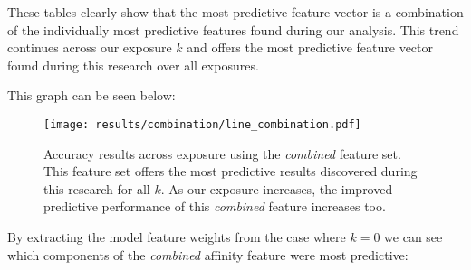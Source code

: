 These tables clearly show that the most predictive feature vector is a combination of the individually most predictive 
features found during our analysis. This trend continues across our exposure $k$ and offers the most predictive feature 
vector found during this research over all exposures.

This graph can be seen below:

\clearpage

\begin{figure}[h]
	\begin{center}
		\texttt{[image: results/combination/line\_combination.pdf]}
		\caption{Accuracy results across exposure using the \emph{combined} feature set. This feature set offers the most predictive 
				 results discovered during this research for all $k$. As our exposure increases, the improved predictive performance of this 
				 \emph{combined} feature increases too.}
	\end{center}
\end{figure}

\clearpage

By extracting the model feature weights from the case where $k=0$ we can see which components of the \emph{combined} affinity feature 
were most predictive:

